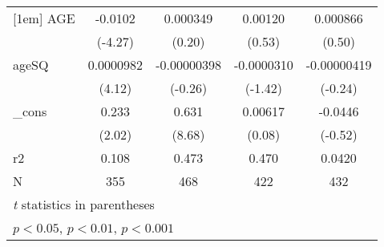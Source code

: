 \begin{table}[htbp]
\begin{tabular}{l*{4}{c}}
[1em]
AGE         &     -0.0102\sym{***}&    0.000349         &     0.00120         &    0.000866         \\
            &     (-4.27)         &      (0.20)         &      (0.53)         &      (0.50)         \\
[1em]
ageSQ       &   0.0000982\sym{***}& -0.00000398         &  -0.0000310         & -0.00000419         \\
            &      (4.12)         &     (-0.26)         &     (-1.42)         &     (-0.24)         \\
[1em]
\_cons      &       0.233\sym{*}  &       0.631\sym{***}&     0.00617         &     -0.0446         \\
            &      (2.02)         &      (8.68)         &      (0.08)         &     (-0.52)         \\
\hline
r2          &       0.108         &       0.473         &       0.470         &      0.0420         \\
N           &         355         &         468         &         422         &         432         \\
\hline\hline
\multicolumn{5}{l}{\footnotesize \textit{t} statistics in parentheses}\\
\multicolumn{5}{l}{\footnotesize \sym{*} \(p<0.05\), \sym{**} \(p<0.01\), \sym{***} \(p<0.001\)}\\
\end{tabular}
\end{table}
